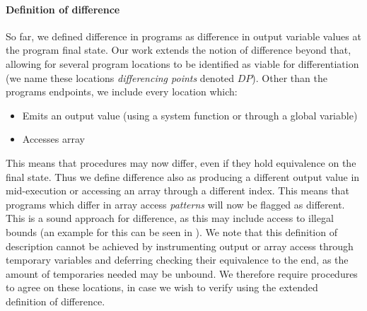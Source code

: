 \paragraph{Definition of difference}
So far, we defined difference in programs as difference in output variable values at the program final state. Our work extends the notion of difference beyond that, allowing for several program locations to be identified as viable for differentiation (we name these locations \emph{differencing points} denoted $DP$). Other than the programs endpoints, we include every location which:
\begin{itemize}
\item Emits an output value (using a system function or through a global variable)
\item Accesses array
\end{itemize}
This means that procedures may now differ, even if they hold equivalence on the final state. Thus we define difference also as producing a different output value in mid-execution or accessing an array through a different index. This means that programs which differ in array access \emph{patterns} will now be flagged as different. This is a sound approach for difference, as this may include access to illegal bounds (an example for this can be seen in ). We note that this definition of description cannot be achieved by instrumenting output or array access through temporary variables and deferring checking their equivalence to the end, as the amount of temporaries needed may be unbound. We therefore require procedures to agree on these locations, in case we wish to verify using the extended definition of difference. 